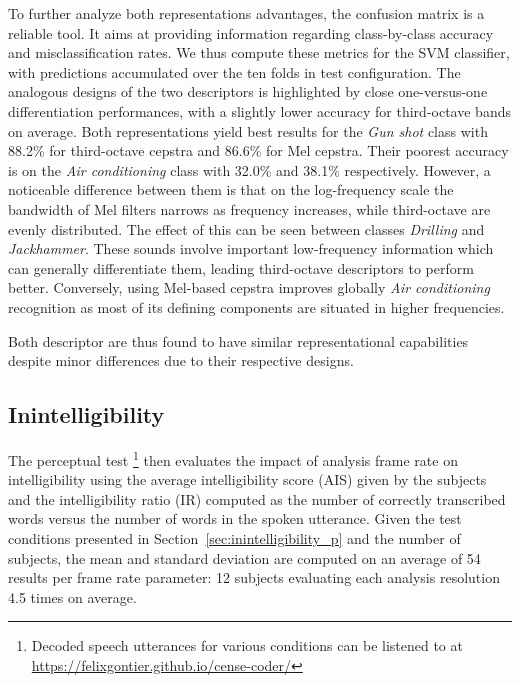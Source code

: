 \documentclass[sensors,article,submit,moreauthors,pdftex,10pt,a4paper]{mdpi}
\begin{document}
To further analyze both representations advantages, the confusion matrix is a reliable tool. It aims at providing information regarding class-by-class accuracy and misclassification rates. We thus compute these metrics for the SVM classifier, with predictions accumulated over the ten folds in test configuration. The analogous designs of the two descriptors is highlighted by close one-versus-one differentiation performances, with a slightly lower accuracy for third-octave bands on average. Both representations yield best results for the \textit{Gun shot} class with 88.2\% for third-octave cepstra and 86.6\% for Mel cepstra. Their poorest accuracy is on the \textit{Air conditioning} class with 32.0\% and 38.1\% respectively. However, a noticeable difference between them is that on the log-frequency scale the bandwidth of Mel filters narrows as frequency increases, while third-octave are evenly distributed. The effect of this can be seen between classes \textit{Drilling} and \textit{Jackhammer}. These sounds involve important low-frequency information which can generally differentiate them, leading third-octave descriptors to perform better. Conversely, using Mel-based cepstra improves globally \textit{Air conditioning} recognition as most of its defining components are situated in higher frequencies.

Both descriptor are thus found to have similar representational capabilities despite minor differences due to their respective designs.


\subsection{Inintelligibility} \label{sec:inintelligibility_r}

The perceptual test \footnote{Decoded speech utterances for various conditions can be listened to at \url{https://felixgontier.github.io/cense-coder/}} then evaluates the impact of analysis frame rate on intelligibility using the average intelligibility score (AIS) given by the subjects and the intelligibility ratio (IR) computed as the number of correctly transcribed words versus the number of words in the spoken utterance. Given the test conditions presented in Section~\ref{sec:inintelligibility_p} and the number of subjects, the mean and standard deviation are computed on an average of 54 results per frame rate parameter: 12 subjects evaluating each analysis resolution 4.5 times on average.
\end{document}
